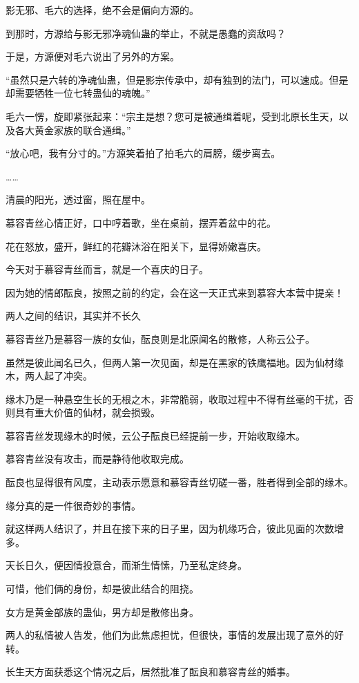\begin{this_body}
影无邪、毛六的选择，绝不会是偏向方源的。

到那时，方源给与影无邪净魂仙蛊的举止，不就是愚蠢的资敌吗？

于是，方源便对毛六说出了另外的方案。

“虽然只是六转的净魂仙蛊，但是影宗传承中，却有独到的法门，可以速成。但是却需要牺牲一位七转蛊仙的魂魄。”

毛六一愣，旋即紧张起来：“宗主是想？您可是被通缉着呢，受到北原长生天，以及各大黄金家族的联合通缉。”

“放心吧，我有分寸的。”方源笑着拍了拍毛六的肩膀，缓步离去。

……

清晨的阳光，透过窗，照在屋中。

慕容青丝心情正好，口中哼着歌，坐在桌前，摆弄着盆中的花。

花在怒放，盛开，鲜红的花瓣沐浴在阳关下，显得娇嫩喜庆。

今天对于慕容青丝而言，就是一个喜庆的日子。

因为她的情郎酝良，按照之前的约定，会在这一天正式来到慕容大本营中提亲！

两人之间的结识，其实并不长久

慕容青丝乃是慕容一族的女仙，酝良则是北原闻名的散修，人称云公子。

虽然是彼此闻名已久，但两人第一次见面，却是在黑家的铁鹰福地。因为仙材缘木，两人起了冲突。

缘木乃是一种悬空生长的无根之木，非常脆弱，收取过程中不得有丝毫的干扰，否则具有重大价值的仙材，就会损毁。

慕容青丝发现缘木的时候，云公子酝良已经提前一步，开始收取缘木。

慕容青丝没有攻击，而是静待他收取完成。

酝良也显得很有风度，主动表示愿意和慕容青丝切磋一番，胜者得到全部的缘木。

缘分真的是一件很奇妙的事情。

就这样两人结识了，并且在接下来的日子里，因为机缘巧合，彼此见面的次数增多。

天长日久，便因情投意合，而渐生情愫，乃至私定终身。

可惜，他们俩的身份，却是彼此结合的阻挠。

女方是黄金部族的蛊仙，男方却是散修出身。

两人的私情被人告发，他们为此焦虑担忧，但很快，事情的发展出现了意外的好转。

长生天方面获悉这个情况之后，居然批准了酝良和慕容青丝的婚事。


\end{this_body}
